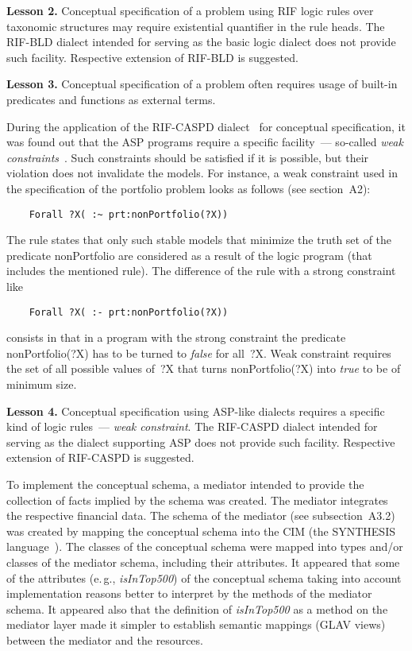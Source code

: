 \begin{multicols}{2}
  \medskip

  \noindent
  \textbf{Lesson 2.} Conceptual specification of a problem using RIF logic rules over
taxonomic structures may require existential quantifier in the rule heads. The
  RIF-BLD dialect intended for serving as the basic logic dialect does not provide
such facility. Respective extension of RIF-BLD is suggested.

  \medskip

  \noindent
  \textbf{Lesson 3.} Conceptual specification of a problem often requires usage of
built-in predicates and functions as external terms.

  During the application of the RIF-CASPD dialect~\cite{24-kal} for conceptual
specification, it was found out that the ASP programs require a specific facility~---
so-called \textit{weak constraints}~\cite{9-kal}. Such constraints should be satisfied if it
is possible, but their violation does not invalidate the models. For instance, a weak
constraint used in the specification of the portfolio problem looks as follows
(see section~A2):
  \begin{verbatim}
    Forall ?X( :~ prt:nonPortfolio(?X))
\end{verbatim}

  The rule states that only such stable models that minimize the truth set of the
predicate {\sf nonPortfolio} are considered as a result of the logic program (that
includes the mentioned rule). The difference of the rule with a {\sf strong constraint}
like
  \begin{verbatim}
    Forall ?X( :- prt:nonPortfolio(?X))
\end{verbatim}
consists in that in a program with the strong constraint the predicate {\sf
nonPortfolio(?X)} has to be turned to \textit{false} for all~{\sf ?X}. Weak constraint
requires the set of all possible values of~{\sf ?X} that turns {\sf nonPortfolio(?X)}
into \textit{true} to be of minimum size.

  \medskip

  \noindent
  \textbf{Lesson 4.} Conceptual specification using ASP-like dialects requires a
specific kind of logic rules~--- \textit{weak constraint}. The RIF-CASPD dialect
intended for serving as the dialect supporting ASP does not provide such facility.
Respective extension of RIF-CASPD is sug\-gested.

  To implement the conceptual schema, a mediator intended to provide the collection
of facts implied by the schema was created. The mediator integrates the respective
financial data. The schema of the mediator (see subsection~A3.2) was created by mapping
 the conceptual schema into the CIM (the SYNTHESIS language~\cite{40-kal}).
The classes of the conceptual schema were mapped into types and/or classes of the
mediator schema, including their attributes. It appeared that some of the attributes
(e.\,g., \textit{isInTop500}) of the conceptual schema taking into account
implementation reasons better to interpret by the methods of the mediator schema. It
appeared also that the definition of \textit{isInTop500} as a method on the mediator
layer made it simpler to establish semantic mappings (GLAV views) between the
mediator and the resources.


\end{multicols}
